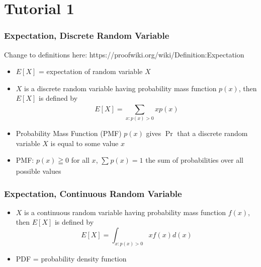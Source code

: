 \section*{Tutorial 1}
\subsubsection*{Expectation, Discrete Random Variable}
Change to definitions here: https://proofwiki.org/wiki/Definition:Expectation
\begin{itemize}
    \item $E[X]$ = expectation of random variable $X$
    \item $X$ is a discrete random variable having probability mass function $p(x)$, then $E[X]$ is defined by 
    \[
        E[X] = \sum_{x:p(x)>0}^{} xp(x)
    \]
    \item Probability Mass Function (PMF) $p(x)$ gives $\Pr$ that a discrete random variable $X$ is equal to some value $x$
    \item PMF: $p(x) \geqq 0$ for all $x$, $\sum_{}^{}p(x) = 1$ the sum of probabilities over all possible values
\end{itemize}
\subsubsection*{Expectation, Continuous Random Variable}
\begin{itemize}
    \item $X$ is a continuous random variable having probability mass function $f(x)$, then $E[X]$ is defined by 
    \[
        E[X] = \int_{x:p(x)>0}^{} xf(x)d(x)
    \]
    \item PDF = probability density function
\end{itemize}

